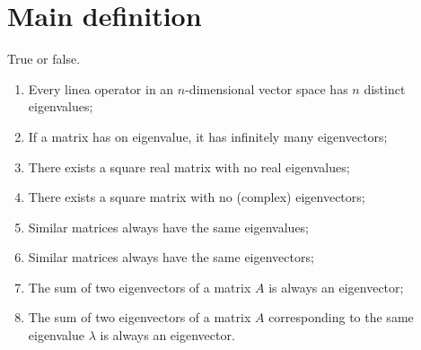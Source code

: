 \documentclass{article}
\begin{document}
\section{Main definition}
\begin{exercise}
  True or false.
  \begin{enumerate}[label={(\alph*)}]
    \item Every linea operator in an $n$-dimensional vector space
      has $n$ distinct eigenvalues;
    \item If a matrix has on eigenvalue, it has infinitely many
      eigenvectors;
    \item There exists a square real matrix with no real eigenvalues;
    \item There exists a square matrix with no (complex) eigenvectors;
    \item Similar matrices always have the same eigenvalues;
    \item Similar matrices always have the same eigenvectors;
    \item The sum of two eigenvectors of a matrix $A$ is always an
      eigenvector;
    \item The sum of two eigenvectors of a matrix $A$ corresponding
      to the same eigenvalue $\lambda$ is always an eigenvector.
  \end{enumerate}
\end{exercise}
\end{document}
